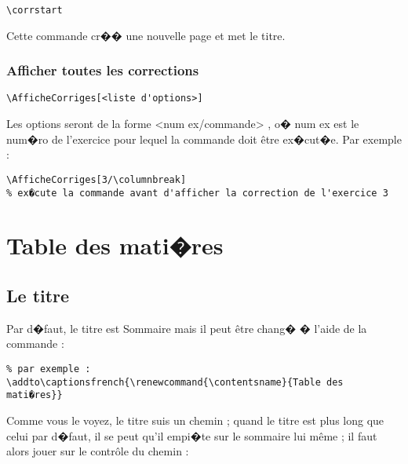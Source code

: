 \documentclass[ams,openany,10pt,presentation,latin1]{mathbook}
\begin{document}
\begin{lstlisting}
\corrstart
\end{lstlisting}

\medskip

Cette commande cr�� une nouvelle page et met le titre.

\subsubsection{Afficher toutes les corrections}

\begin{lstlisting}
\AfficheCorriges[<liste d'options>]
\end{lstlisting}

Les options seront de la forme \og <num ex/commande> \fg, o� \og num ex \fg{} est le num�ro de l'exercice pour lequel la commande doit \^etre ex�cut�e. Par exemple :

\medskip

\begin{lstlisting}
\AfficheCorriges[3/\columnbreak] 
% ex�cute la commande avant d'afficher la correction de l'exercice 3
\end{lstlisting}

\corrstart\enlargethispage*{\baselineskip}


\newpage\pagecolor{white}

\section{Table des mati�res}

\subsection{Le titre}

Par d�faut, le titre est \og Sommaire \fg{} mais il peut \^etre chang� � l'aide de la commande :

\medskip

\begin{lstlisting}
% par exemple :
\addto\captionsfrench{\renewcommand{\contentsname}{Table des mati�res}}
\end{lstlisting}

\medskip

Comme vous le voyez, le titre suis un \og chemin \fg{} ; quand le titre est plus long que celui par d�faut, il se peut qu'il empi�te sur le sommaire lui m\^eme ; il faut alors jouer sur le \og contr\^ole \fg{} du chemin :
\end{document}

